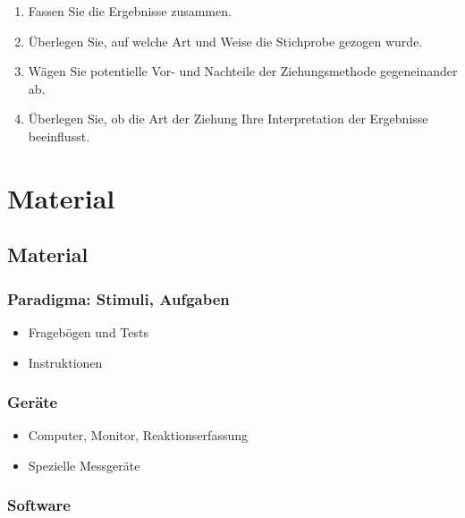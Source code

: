 \documentclass[
]{book}
\begin{document}
\begin{enumerate}
\def\labelenumi{\arabic{enumi}.}
\item
  Fassen Sie die Ergebnisse zusammen.
\item
  Überlegen Sie, auf welche Art und Weise die Stichprobe gezogen wurde.
\item
  Wägen Sie potentielle Vor- und Nachteile der Ziehungsmethode gegeneinander ab.
\item
  Überlegen Sie, ob die Art der Ziehung Ihre Interpretation der Ergebnisse beeinflusst.
\end{enumerate}

\hypertarget{material}{%
\section{Material}\label{material}}

\hypertarget{material-1}{%
\subsection{Material}\label{material-1}}

\hypertarget{paradigma-stimuli-aufgaben}{%
\subsubsection{Paradigma: Stimuli, Aufgaben}\label{paradigma-stimuli-aufgaben}}

\begin{itemize}
\item
  Fragebögen und Tests
\item
  Instruktionen
\end{itemize}

\hypertarget{geruxe4te}{%
\subsubsection{Geräte}\label{geruxe4te}}

\begin{itemize}
\item
  Computer, Monitor, Reaktionserfassung
\item
  Spezielle Messgeräte
\end{itemize}

\hypertarget{software}{%
\subsubsection{Software}\label{software}}
\end{document}
